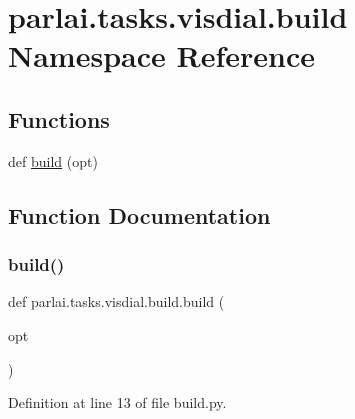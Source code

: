 \hypertarget{namespaceparlai_1_1tasks_1_1visdial_1_1build}{}\section{parlai.\+tasks.\+visdial.\+build Namespace Reference}
\label{namespaceparlai_1_1tasks_1_1visdial_1_1build}
\subsection*{Functions}
\begin{DoxyCompactItemize}
\item 
def \hyperlink{namespaceparlai_1_1tasks_1_1visdial_1_1build_a67068d01ede2596cbe1100e5f0896f3c}{build} (opt)
\end{DoxyCompactItemize}


\subsection{Function Documentation}
\mbox{\label{namespaceparlai_1_1tasks_1_1visdial_1_1build_a67068d01ede2596cbe1100e5f0896f3c}} 
\subsubsection{\texorpdfstring{build()}{build()}}
{\footnotesize\ttfamily def parlai.\+tasks.\+visdial.\+build.\+build (\begin{DoxyParamCaption}\item[{}]{opt }\end{DoxyParamCaption})}



Definition at line 13 of file build.\+py.


